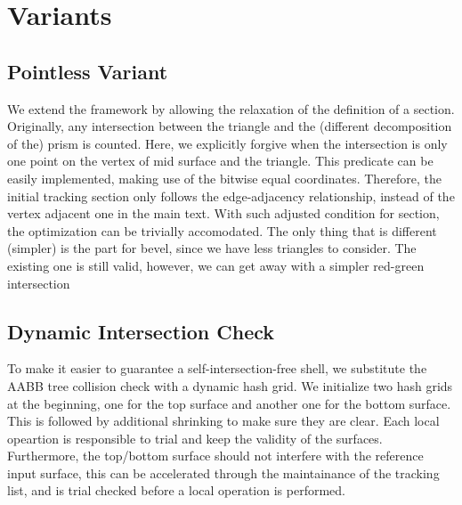 \section{Variants}
\subsection{Pointless Variant}
We extend the framework by allowing the relaxation of the definition of a section. 
Originally, any intersection between the triangle and the (different decomposition of the) prism is counted. Here, we explicitly forgive when the intersection is only one point on the vertex of mid surface and the triangle. 
This predicate can be easily implemented, making use of the bitwise equal coordinates.
Therefore, the initial tracking section only follows the edge-adjacency relationship, instead of the vertex adjacent one in the main text. 
With such adjusted condition for section, the optimization can be trivially accomodated. The only thing that is different (simpler) is the part for bevel, since we have less triangles to consider.
The existing one is still valid, however, we can get away with a simpler red-green intersection

\subsection{Dynamic Intersection Check}
To make it easier to guarantee a self-intersection-free shell, we substitute the AABB tree collision check with a dynamic hash grid. We initialize two hash grids at the beginning, one for the top surface and another one for the bottom surface. This is followed by additional shrinking to make sure they are clear. Each local opeartion is responsible to trial and keep the validity of the surfaces. Furthermore, the top/bottom surface should not interfere with the reference input surface, this can be accelerated through the maintainance of the tracking list, and is trial checked before a local operation is performed.
